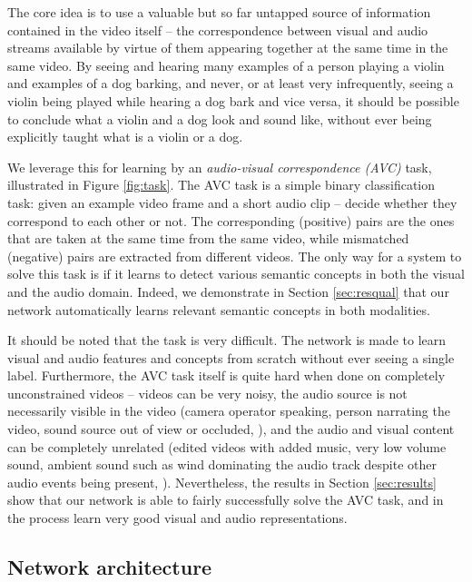 \documentclass[10pt,twocolumn,letterpaper]{article}
\begin{document}
The core idea is to use a valuable but so far
untapped source of information contained in the video itself --
the correspondence between visual and audio streams available by
virtue of them appearing together at the same time in the same video.
By seeing and hearing many examples of a person playing a violin
and examples of a dog barking, and never, or at least very infrequently,
seeing a violin being played while hearing a dog bark and vice versa,
it should be possible to conclude what a violin and a dog look and sound
like, without ever being explicitly taught what is a violin or a dog.

\figTask

We leverage this for learning by an
\emph{audio-visual correspondence (AVC)}
task, illustrated in Figure \ref{fig:task}.
The AVC task is a simple binary classification task:
given an example video frame and a short audio clip -- decide whether
they correspond to each other or not. The corresponding (positive) pairs
are the ones that are taken at the same time from the same video,
while mismatched (negative) pairs are extracted from different videos.
The only way for a system to solve this task is if it learns
to detect various semantic concepts in both the visual and the audio domain.
Indeed, we demonstrate in Section \ref{sec:resqual} that our network
automatically learns relevant semantic concepts in both modalities.

%

It should be noted that the task is very difficult.
The network is made to learn visual and audio features and concepts from
scratch without ever seeing a single label.
Furthermore, the AVC task itself is quite hard when done on
completely unconstrained videos -- videos can be very noisy,
the audio source is not necessarily visible in the video
(\eg camera operator speaking, person narrating the video,
sound source out of view or occluded, \etc),
and the audio and visual content can be completely unrelated
(\eg edited videos with added music, very low volume sound,
ambient sound such as wind dominating the audio track despite
other audio events being present, \etc).
Nevertheless, the results in Section \ref{sec:results} show that our network
is able to fairly successfully solve the AVC task, and in the process
learn very good visual and audio representations.


\subsection{Network architecture}
%
\label{sec:network}
\end{document}
